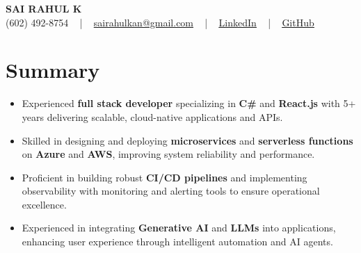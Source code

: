 \documentclass[letterpaper,11pt]{article}
\newcommand{\resumeItem}[1]{
  \item\footnotesize{
    {#1 \vspace{-2pt}}
  }
}
\newcommand{\resumeItemListStart}{\begin{itemize}[leftmargin=*]}
\newcommand{\resumeItemListEnd}{\end{itemize}\vspace{-5pt}}
\begin{document}
\begin{center}
    {\fontsize{14pt}{12pt}\selectfont \textbf{\MakeUppercase{Sai Rahul K}}}\\ \vspace{2pt}
    \fontsize{10pt}{12pt}\selectfont (602) 492-8754 ~ | ~ \href{mailto:sairahulkan@gmail.com}{sairahulkan@gmail.com} ~ | ~
    \href{https://www.linkedin.com/in/rq123/}{\color{blue}\underline{LinkedIn}} ~ | ~
    \href{https://github.com/kanrahuldo}{\color{blue}\underline{GitHub}}~
    \vspace{-8pt}
\end{center}

\section{Summary}
\fontsize{9pt}{10pt}\selectfont
\resumeItemListStart
    \resumeItem{Experienced \textbf{full stack developer} specializing in \textbf{C\#} and \textbf{React.js} with 5+ years delivering scalable, cloud-native applications and APIs.}
    \resumeItem{Skilled in designing and deploying \textbf{microservices} and \textbf{serverless functions} on \textbf{Azure} and \textbf{AWS}, improving system reliability and performance.}
    \resumeItem{Proficient in building robust \textbf{CI/CD pipelines} and implementing observability with monitoring and alerting tools to ensure operational excellence.}
    \resumeItem{Experienced in integrating \textbf{Generative AI} and \textbf{LLMs} into applications, enhancing user experience through intelligent automation and AI agents.}
\resumeItemListEnd
\vspace{-6pt}
\end{document}
